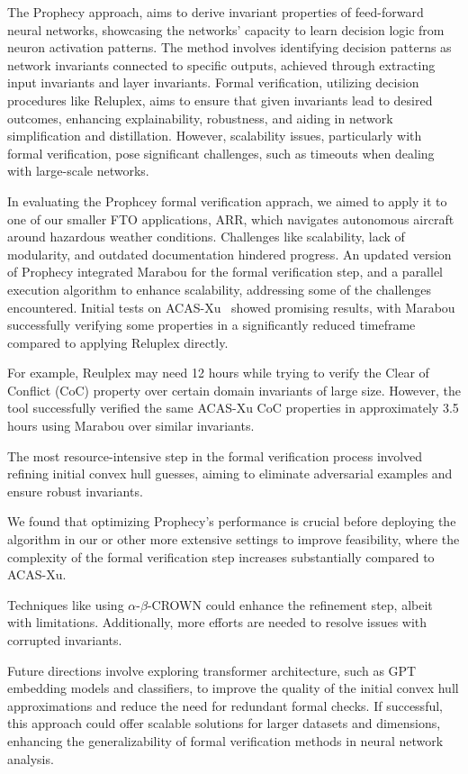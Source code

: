The Prophecy approach\cite{Gopinath2019FindingII,8952519}, aims to derive invariant properties of feed-forward neural networks, showcasing the networks' capacity to learn decision logic from neuron activation patterns. The method involves identifying decision patterns as network invariants connected to specific outputs, achieved through extracting input invariants and layer invariants. Formal verification, utilizing decision procedures like Reluplex\cite{10.1007/s10703-021-00363-7}, aims to ensure that given invariants lead to desired outcomes, enhancing explainability, robustness, and aiding in network simplification and distillation. However, scalability issues, particularly with formal verification, pose significant challenges, such as timeouts when dealing with large-scale networks. 

In evaluating the Prophcey formal verification apprach, we aimed to apply it to one of our smaller FTO applications, ARR, which navigates autonomous aircraft around hazardous weather conditions. 
Challenges like scalability, lack of modularity, and outdated documentation hindered progress. An updated version of Prophecy\cite{safednn-nasa} integrated Marabou for the formal verification step, and a parallel execution algorithm to enhance scalability, addressing some of the challenges encountered. Initial tests on ACAS-Xu~\cite{10.1007/978-3-030-62822-2_4} showed promising results, with Marabou successfully verifying some properties in a significantly reduced timeframe compared to applying Reluplex directly. 

For example, Reulplex may need 12 hours while trying to verify the Clear of Conflict (CoC) property over certain domain invariants of large size. However, the tool successfully verified the same ACAS-Xu CoC properties in approximately 3.5 hours using Marabou over similar invariants.

The most resource-intensive step in the formal verification process involved refining initial convex hull guesses, aiming to eliminate adversarial examples and ensure robust invariants. 

We found that optimizing Prophecy's performance is crucial before deploying the algorithm in our or other more extensive settings to improve feasibility, where the complexity of the formal verification step increases substantially compared to ACAS-Xu.

Techniques like using $\alpha$-$\beta$-CROWN could enhance the refinement step, albeit with limitations. %
Additionally, more efforts are needed to resolve issues with corrupted invariants.


Future directions involve exploring transformer architecture, such as  GPT embedding models\cite{GPT4} and classifiers, to improve the quality of the initial convex hull approximations and reduce the need for redundant formal checks. If successful, this approach could offer scalable solutions for larger datasets and dimensions, enhancing the generalizability of formal verification methods in neural network analysis.